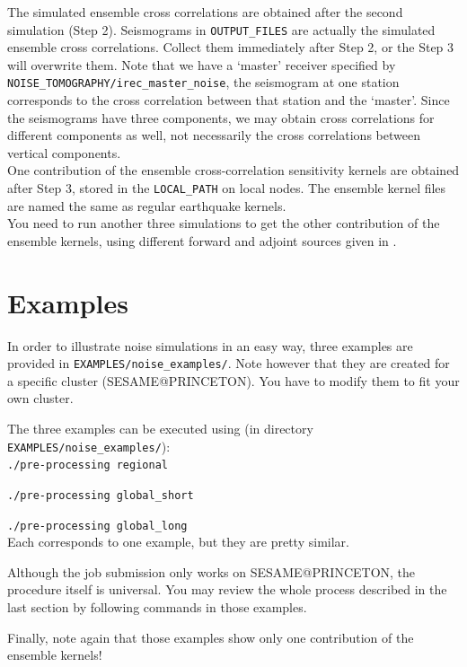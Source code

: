 \documentclass[oneside,english]{book}
\begin{document}
The simulated ensemble cross correlations are obtained after the second simulation (Step 2).
Seismograms in \texttt{OUTPUT\_FILES} are actually the simulated ensemble cross correlations.
Collect them immediately after Step 2, or the Step 3 will overwrite them.
Note that we have a `master' receiver specified by \texttt{NOISE\_TOMOGRAPHY/irec\_master\_noise},
the seismogram at one station corresponds to the cross correlation between that station and the `master'.
Since the seismograms have three components, we may obtain cross correlations
for different components as well, not necessarily the cross correlations between vertical components.\\

One contribution of the ensemble cross-correlation sensitivity kernels are obtained after Step 3,
stored in the \texttt{LOCAL\_PATH} on local nodes.
The ensemble kernel files are named the same as regular earthquake kernels.\\

You need to run another three simulations to get the other contribution of the ensemble kernels,
using different forward and adjoint sources given in \citet{trompetal2010}.

\section{Examples}

In order to illustrate noise simulations in an easy way, three examples are provided in
\texttt{EXAMPLES/noise\_examples/}.
Note however that they are created for a specific cluster (SESAME@PRINCETON).
You have to modify them to fit your own cluster.

The three examples can be executed using (in directory \texttt{EXAMPLES/noise\_examples/}):\\

\texttt{./pre-processing regional}

\texttt{./pre-processing global\_short}

\texttt{./pre-processing global\_long}\\

Each corresponds to one example, but they are pretty similar.

Although the job submission only works on SESAME@PRINCETON, the procedure itself is universal.
You may review the whole process described in the last section by following commands in those examples.

Finally, note again that those examples show only one contribution of the ensemble kernels!
\end{document}

